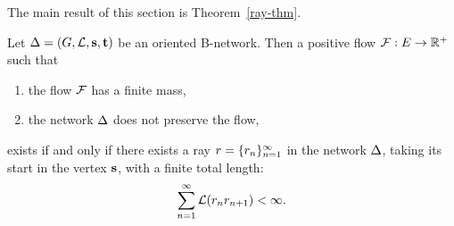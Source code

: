\documentclass[12pt,oneside,a4paper]{amsart}
\begin{document}
    The main result of this section is Theorem~\ref{ray-thm}.
    \begin{theorem}
      \label{ray-thm}
      Let $\Delta = (G, \mathcal{L}, \mathbf{s}, \mathbf{t})$ be an oriented B-network.
      Then a positive flow $\mathcal{F}: E \to \mathbb{R}^{+}$ such that
      \begin{enumerate}[label=(\alph*)]
        \item the flow $\mathcal{F}$ has a finite mass,
        \item the network $\Delta$ does not preserve the flow,
      \end{enumerate}
      exists if and only if there exists a ray $r = \{{r}_n\}_{n=1}^\infty$ in the network $\Delta$, taking its start in the vertex $\mathbf{s}$,
        with a finite total length:
      \[
        \sum_{n=1}^\infty \mathcal{L}(r_n r_{n+1}) < \infty.
      \]
    \end{theorem}
\end{document}
